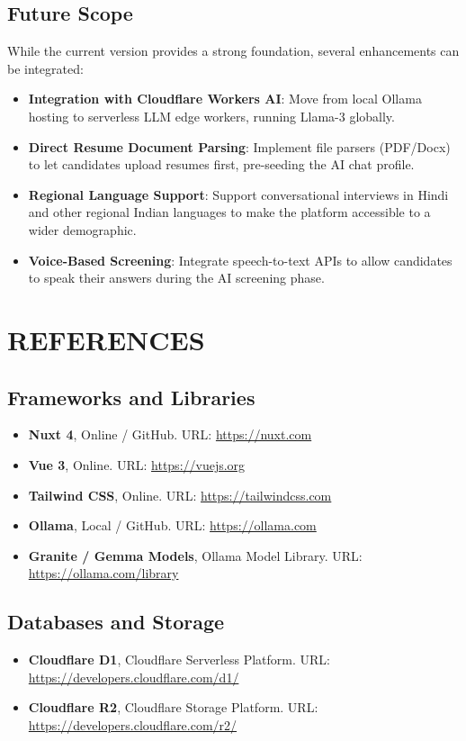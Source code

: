 \documentclass[12pt,a4paper]{report}
\begin{document}
\section{Future Scope}

While the current version provides a strong foundation, several enhancements can be integrated:
\begin{itemize}
    \item \textbf{Integration with Cloudflare Workers AI}: Move from local Ollama hosting to serverless LLM edge workers, running Llama-3 globally.
    \item \textbf{Direct Resume Document Parsing}: Implement file parsers (PDF/Docx) to let candidates upload resumes first, pre-seeding the AI chat profile.
    \item \textbf{Regional Language Support}: Support conversational interviews in Hindi and other regional Indian languages to make the platform accessible to a wider demographic.
    \item \textbf{Voice-Based Screening}: Integrate speech-to-text APIs to allow candidates to speak their answers during the AI screening phase.
\end{itemize}


\chapter{REFERENCES}

\section{Frameworks and Libraries}
\begin{itemize}
    \item \textbf{Nuxt 4}, Online / GitHub. URL: \url{https://nuxt.com}
    \item \textbf{Vue 3}, Online. URL: \url{https://vuejs.org}
    \item \textbf{Tailwind CSS}, Online. URL: \url{https://tailwindcss.com}
    \item \textbf{Ollama}, Local / GitHub. URL: \url{https://ollama.com}
    \item \textbf{Granite / Gemma Models}, Ollama Model Library. URL: \url{https://ollama.com/library}
\end{itemize}

\section{Databases and Storage}
\begin{itemize}
    \item \textbf{Cloudflare D1}, Cloudflare Serverless Platform. URL: \url{https://developers.cloudflare.com/d1/}
    \item \textbf{Cloudflare R2}, Cloudflare Storage Platform. URL: \url{https://developers.cloudflare.com/r2/}
\end{itemize}
\end{document}
